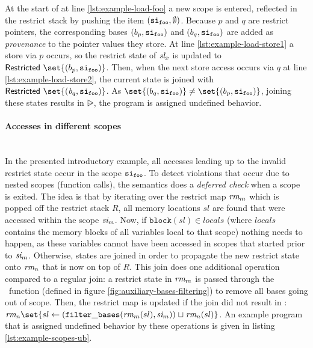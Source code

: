 At the start of  at line \ref{lst:example-load-foo} a new scope is entered, reflected in the restrict stack by pushing
the item $(\mathtt{si}_\mathtt{foo}, \emptyset)$.
Because $p$ and $q$ are restrict pointers, 
the corresponding bases $(b_p,\mathtt{si}_\mathtt{foo})$ and $(b_q,\mathtt{si}_\mathtt{foo})$ are added as \textit{provenance} to the pointer values they store.
At line \ref{lst:example-load-store1} a store via $p$ occurs, so the restrict state of $\textit{sl}_x$ is updated to $\restricted{\set{(b_p, \scope{foo})}}$.
Then, when the next store access occurs via $q$ at line \ref{lst:example-load-store2}, the
current state is joined with $\restricted{\set{(\Blockvar_q, \scope{foo})}}$.
As $\set{(b_q, \scope{foo})} \neq \set{(b_p, \scope{foo})}$, joining these states results in $\rsub$, \ie the program is assigned undefined behavior.

\paragraph {Accesses in different scopes}
\leavevmode \\
In the presented introductory example, all accesses leading up to the invalid restrict state occur in the scope $\mathtt{si}_\mathtt{foo}$.
To detect violations that occur due to nested scopes (\eg function calls), the \cink{} semantics does a \textit{deferred check} when a scope is exited.
The idea is that by iterating over the restrict map $\textit{rm}_m$ which is popped off the restrict stack $R$,
all memory locations $sl$ are found that were accessed within the scope $\textit{si}_m$.
Now, if $\mathtt{block}(sl) \in \mathit{locals}$ (where $\mathit{locals}$ contains the 
memory blocks of all variables local to that scope) nothing needs to happen, as these variables cannot have been accessed in scopes
that started prior to $\textit{si}_m$.
Otherwise, states are joined in order to propagate the new restrict state onto $\textit{rm}_n$ that is now on top of $R$.
This join does one additional operation compared to a regular join: a restrict state in $\textit{rm}_m$ is passed through the
\filterbases \ function (defined in figure \ref{fig:auxiliary-bases-filtering}) to remove all bases going out of scope.
Then, the restrict map is updated if the join did not result in \rsub: $\Restrictmapvar_n\set{sl \leftarrow (\filterbases (\Restrictmapvar_m(sl), \Scopeidvar_m)) \joinsym \Restrictmapvar_n(sl)}$.
An example program that is assigned undefined behavior by these operations is given in listing \ref{lst:example-scopes-ub}.



